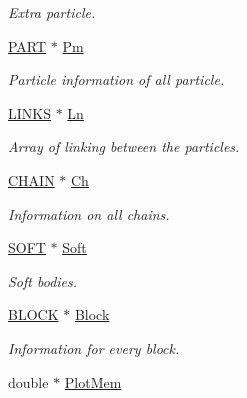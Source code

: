 \begin{DoxyCompactItemize}
\begin{DoxyCompactList}\small\item\em Extra particle. \end{DoxyCompactList}\item 
\hyperlink{structPART}{P\+A\+RT} $\ast$ \hyperlink{classVarData_a53eee20378b4a2c61407897d98a4b5d7}{Pm}\hypertarget{classVarData_a53eee20378b4a2c61407897d98a4b5d7}{}\label{classVarData_a53eee20378b4a2c61407897d98a4b5d7}

\begin{DoxyCompactList}\small\item\em Particle information of all particle. \end{DoxyCompactList}\item 
\hyperlink{structLINKS}{L\+I\+N\+KS} $\ast$ \hyperlink{classVarData_a8864e546987744c3b932ff2a3b8c1291}{Ln}\hypertarget{classVarData_a8864e546987744c3b932ff2a3b8c1291}{}\label{classVarData_a8864e546987744c3b932ff2a3b8c1291}

\begin{DoxyCompactList}\small\item\em Array of linking between the particles. \end{DoxyCompactList}\item 
\hyperlink{structCHAIN}{C\+H\+A\+IN} $\ast$ \hyperlink{classVarData_af2deb35998deb81dc9ef4ae6f65cc27d}{Ch}\hypertarget{classVarData_af2deb35998deb81dc9ef4ae6f65cc27d}{}\label{classVarData_af2deb35998deb81dc9ef4ae6f65cc27d}

\begin{DoxyCompactList}\small\item\em Information on all chains. \end{DoxyCompactList}\item 
\hyperlink{structSOFT}{S\+O\+FT} $\ast$ \hyperlink{classVarData_aba4b9513e79903ba8a0f586f1cef52ef}{Soft}\hypertarget{classVarData_aba4b9513e79903ba8a0f586f1cef52ef}{}\label{classVarData_aba4b9513e79903ba8a0f586f1cef52ef}

\begin{DoxyCompactList}\small\item\em Soft bodies. \end{DoxyCompactList}\item 
\hyperlink{structBLOCK}{B\+L\+O\+CK} $\ast$ \hyperlink{classVarData_ab8ead2169b1b4894b78fd3c264b6009e}{Block}\hypertarget{classVarData_ab8ead2169b1b4894b78fd3c264b6009e}{}\label{classVarData_ab8ead2169b1b4894b78fd3c264b6009e}

\begin{DoxyCompactList}\small\item\em Information for every block. \end{DoxyCompactList}\item 
double $\ast$ \hyperlink{classVarData_ac5723b66cbed09bdf120939a3434165a}{Plot\+Mem}\hypertarget{classVarData_ac5723b66cbed09bdf120939a3434165a}{}\label{classVarData_ac5723b66cbed09bdf120939a3434165a}


\end{DoxyCompactItemize}
